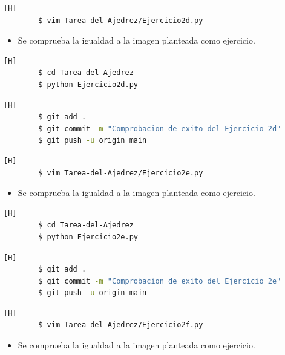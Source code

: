 \documentclass{article}
\begin{document}
 \begin{lstlisting}[language=bash,caption={Creando Ejercicio2d.py}][H]
		$ vim Tarea-del-Ajedrez/Ejercicio2d.py
	\end{lstlisting}
	
	
\begin{itemize}
    \item  Se comprueba la igualdad a la imagen planteada como ejercicio.
\end{itemize}

	\begin{lstlisting}[language=bash,caption={Probando código}][H]
		$ cd Tarea-del-Ajedrez
		$ python Ejercicio2d.py
	\end{lstlisting}
	\begin{lstlisting}[language=bash,caption={Commit: Comprobacion de exito del Ejercicio 2d}][H]
		$ git add .
		$ git commit -m "Comprobacion de exito del Ejercicio 2d"			
		$ git push -u origin main
	\end{lstlisting}

 \begin{lstlisting}[language=bash,caption={Creando Ejercicio2e.py}][H]
		$ vim Tarea-del-Ajedrez/Ejercicio2e.py
	\end{lstlisting}
	
	
\begin{itemize}
    \item  Se comprueba la igualdad a la imagen planteada como ejercicio.
\end{itemize}

	\begin{lstlisting}[language=bash,caption={Probando código}][H]
		$ cd Tarea-del-Ajedrez
		$ python Ejercicio2e.py
	\end{lstlisting}
	\begin{lstlisting}[language=bash,caption={Commit: Comprobacion de exito del Ejercicio 2e}][H]
		$ git add .
		$ git commit -m "Comprobacion de exito del Ejercicio 2e"			
		$ git push -u origin main
	\end{lstlisting}
 
		 \begin{lstlisting}[language=bash,caption={Creando Ejercicio2f.py}][H]
		$ vim Tarea-del-Ajedrez/Ejercicio2f.py
	\end{lstlisting}
	
	
\begin{itemize}
    \item  Se comprueba la igualdad a la imagen planteada como ejercicio.
\end{itemize}
\end{document}
